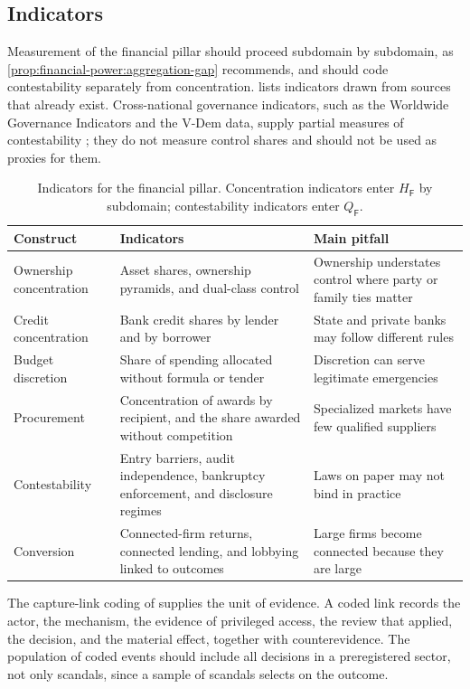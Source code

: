 \documentclass[11pt,letterpaper]{article}
\theoremstyle{definition}
\theoremstyle{remark}
\newcommand{\pF}{\mathsf{F}}
\begin{document}
\subsection{Indicators}

Measurement of the financial pillar should proceed subdomain by subdomain, as \cref{prop:financial-power:aggregation-gap} recommends, and should code contestability separately from concentration.  lists indicators drawn from sources that already exist. Cross-national governance indicators, such as the Worldwide Governance Indicators and the V-Dem data, supply partial measures of contestability \citep{kaufmann2010,coppedge2011}; they do not measure control shares and should not be used as proxies for them.

\begin{table}[t]
\centering
\small
\caption{Indicators for the financial pillar. Concentration indicators enter $H_{\pF}$ by subdomain; contestability indicators enter $Q_{\pF}$.}
\label{tab:indicators}
\begin{tabularx}{\linewidth}{@{}L{2.6cm}YY@{}}
\toprule
Construct & Indicators & Main pitfall \\
\midrule
Ownership concentration & Asset shares, ownership pyramids, and dual-class control & Ownership understates control where party or family ties matter \\
Credit concentration & Bank credit shares by lender and by borrower & State and private banks may follow different rules \\
Budget discretion & Share of spending allocated without formula or tender & Discretion can serve legitimate emergencies \\
Procurement & Concentration of awards by recipient, and the share awarded without competition & Specialized markets have few qualified suppliers \\
Contestability & Entry barriers, audit independence, bankruptcy enforcement, and disclosure regimes & Laws on paper may not bind in practice \\
Conversion & Connected-firm returns, connected lending, and lobbying linked to outcomes & Large firms become connected because they are large \\
\bottomrule
\end{tabularx}
\end{table}

The capture-link coding of \citet{largo2026hbs} supplies the unit of evidence. A coded link records the actor, the mechanism, the evidence of privileged access, the review that applied, the decision, and the material effect, together with counterevidence. The population of coded events should include all decisions in a preregistered sector, not only scandals, since a sample of scandals selects on the outcome.
\end{document}
